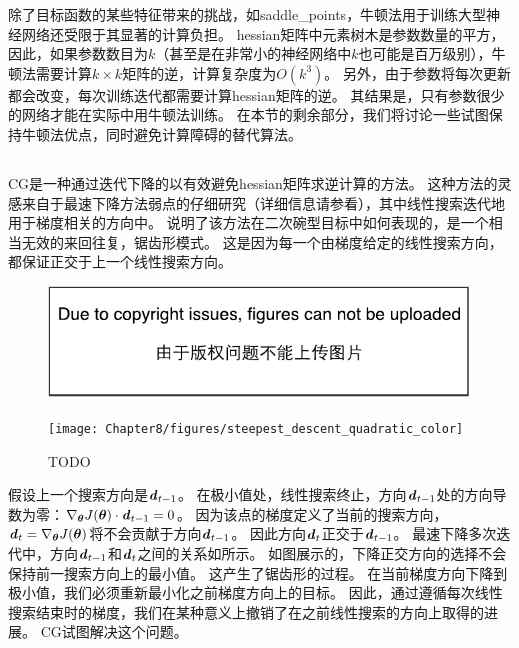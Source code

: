 除了目标函数的某些特征带来的挑战，如\gls{saddle_points}，牛顿法用于训练大型神经网络还受限于其显著的计算负担。
\gls{hessian}矩阵中元素树木是参数数量的平方，因此，如果参数数目为$k$（甚至是在非常小的神经网络中$k$也可能是百万级别），牛顿法需要计算$k\times k$矩阵的逆，计算复杂度为$O(k^3)$。
另外，由于参数将每次更新都会改变，每次训练迭代都需要计算\gls{hessian}矩阵的逆。
其结果是，只有参数很少的网络才能在实际中用牛顿法训练。
在本节的剩余部分，我们将讨论一些试图保持牛顿法优点，同时避免计算障碍的替代算法。

\subsection{}
\label{sec:conjugate_gradients}
\gls{CG}是一种通过迭代下降的以有效避免\gls{hessian}矩阵求逆计算的方法。
这种方法的灵感来自于最速下降方法弱点的仔细研究（详细信息请参看），其中线性搜索迭代地用于梯度相关的方向中。
说明了该方法在二次碗型目标中如何表现的，是一个相当无效的来回往复，锯齿形模式。
这是因为每一个由梯度给定的线性搜索方向，都保证正交于上一个线性搜索方向。

\begin{figure}[!htb]
\ifOpenSource
\centerline{\includegraphics{figure.pdf}}
\else
\centerline{\texttt{[image: Chapter8/figures/steepest\_descent\_quadratic\_color]}}
\fi
\caption{TODO}
\label{fig:chap8_steepest_descent_quadratic}
\end{figure}



假设上一个搜索方向是$\boldsymbol{\mathit{d}}_{t-1}$。   
在极小值处，线性搜索终止，方向$\boldsymbol{\mathit{d}}_{t-1}$处的方向导数为零：$\nabla_{\boldsymbol{\theta}} J(\boldsymbol{\theta}) \cdot \boldsymbol{\mathit{d}}_{t-1} = 0$。
因为该点的梯度定义了当前的搜索方向，$\boldsymbol{\mathit{d}}_t = \nabla_{\boldsymbol{\theta}} J(\boldsymbol{\theta})$将不会贡献于方向$\boldsymbol{\mathit{d}}_{t-1}$。
因此方向$\boldsymbol{\mathit{d}}_t$正交于$\boldsymbol{\mathit{d}}_{t-1}$。
最速下降多次迭代中，方向$\boldsymbol{\mathit{d}}_{t-1}$和$\boldsymbol{\mathit{d}}_t$之间的关系如所示。
如图展示的，下降正交方向的选择不会保持前一搜索方向上的最小值。
这产生了锯齿形的过程。
在当前梯度方向下降到极小值，我们必须重新最小化之前梯度方向上的目标。
因此，通过遵循每次线性搜索结束时的梯度，我们在某种意义上撤销了在之前线性搜索的方向上取得的进展。
\gls{CG}试图解决这个问题。

